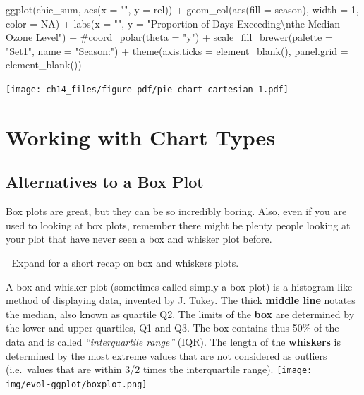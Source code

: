 \documentclass[
  letterpaper,
  DIV=11,
  numbers=noendperiod]{scrreprt}
\newenvironment{Shaded}{\begin{snugshade}}{\end{snugshade}}
\newcommand{\AttributeTok}[1]{\textcolor[rgb]{0.40,0.45,0.13}{#1}}
\newcommand{\CommentTok}[1]{\textcolor[rgb]{0.37,0.37,0.37}{#1}}
\newcommand{\ConstantTok}[1]{\textcolor[rgb]{0.56,0.35,0.01}{#1}}
\newcommand{\DecValTok}[1]{\textcolor[rgb]{0.68,0.00,0.00}{#1}}
\newcommand{\FunctionTok}[1]{\textcolor[rgb]{0.28,0.35,0.67}{#1}}
\newcommand{\NormalTok}[1]{\textcolor[rgb]{0.00,0.23,0.31}{#1}}
\newcommand{\SpecialCharTok}[1]{\textcolor[rgb]{0.37,0.37,0.37}{#1}}
\newcommand{\StringTok}[1]{\textcolor[rgb]{0.13,0.47,0.30}{#1}}
\begin{document}
\begin{Shaded}
\begin{Highlighting}[]
\FunctionTok{ggplot}\NormalTok{(chic\_sum, }\FunctionTok{aes}\NormalTok{(}\AttributeTok{x =} \StringTok{""}\NormalTok{, }\AttributeTok{y =}\NormalTok{ rel)) }\SpecialCharTok{+}
  \FunctionTok{geom\_col}\NormalTok{(}\FunctionTok{aes}\NormalTok{(}\AttributeTok{fill =}\NormalTok{ season), }\AttributeTok{width =} \DecValTok{1}\NormalTok{, }\AttributeTok{color =} \ConstantTok{NA}\NormalTok{) }\SpecialCharTok{+}
  \FunctionTok{labs}\NormalTok{(}\AttributeTok{x =} \StringTok{""}\NormalTok{, }\AttributeTok{y =} \StringTok{"Proportion of Days Exceeding}\SpecialCharTok{\textbackslash{}n}\StringTok{the Median Ozone Level"}\NormalTok{) }\SpecialCharTok{+}
  \CommentTok{\#coord\_polar(theta = "y") +}
  \FunctionTok{scale\_fill\_brewer}\NormalTok{(}\AttributeTok{palette =} \StringTok{"Set1"}\NormalTok{, }\AttributeTok{name =} \StringTok{"Season:"}\NormalTok{) }\SpecialCharTok{+}
  \FunctionTok{theme}\NormalTok{(}\AttributeTok{axis.ticks =} \FunctionTok{element\_blank}\NormalTok{(),}
        \AttributeTok{panel.grid =} \FunctionTok{element\_blank}\NormalTok{())}
\end{Highlighting}
\end{Shaded}

\texttt{[image: ch14\_files/figure-pdf/pie-chart-cartesian-1.pdf]}


\chapter{Working with Chart Types}\label{charts}

\section{Alternatives to a Box Plot}\label{alternatives-to-a-box-plot}

Box plots are great, but they can be so incredibly boring. Also, even if
you are used to looking at box plots, remember there might be plenty
people looking at your plot that have never seen a box and whisker plot
before.

💁 Expand for a short recap on box and whiskers plots.

A box-and-whisker plot (sometimes called simply a box plot) is a
histogram-like method of displaying data, invented by J. Tukey. The
thick \textbf{middle line} notates the median, also known as quartile
Q2. The limits of the \textbf{box} are determined by the lower and upper
quartiles, Q1 and Q3. The box contains thus 50\% of the data and is
called \emph{``interquartile range''} (IQR). The length of the
\textbf{whiskers} is determined by the most extreme values that are not
considered as outliers (i.e.~values that are within 3/2 times the
interquartile range). \texttt{[image: img/evol-ggplot/boxplot.png]}
\end{document}
